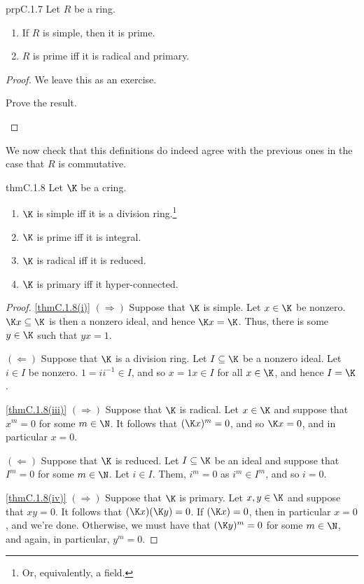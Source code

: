 \begin{prp}{}{prpC.1.7}
	Let $R$ be a ring.
	\begin{enumerate}
		\item \label{prpC.1.7(i)}If $R$ is simple, then it is prime.
		\item \label{prpC.1.7(ii)}$R$ is prime iff it is radical and primary.
	\end{enumerate}
	\begin{proof}
		We leave this as an exercise.
		\begin{exr}[breakable=false]{}{}
			Prove the result.
		\end{exr}
	\end{proof}
\end{prp}
We now check that this definitions do indeed agree with the previous ones in the case that $R$ is commutative.
\begin{thm}{}{thmC.1.8}
	Let $\K$ be a cring.
	\begin{enumerate}
		\item \label{thmC.1.8(i)}$\K$ is simple iff it is a division ring.\footnote{Or, equivalently, a field.}
		\item \label{thmC.1.8(ii)}$\K$ is prime iff it is integral.
		\item \label{thmC.1.8(iii)}$\K$ is radical iff it is reduced.
		\item \label{thmC.1.8(iv)}$\K$ is primary iff it hyper-connected.
	\end{enumerate}
	\begin{proof}
		\cref{thmC.1.8(i)} $(\Rightarrow )$ Suppose that $\K$ is simple.  Let $x\in \K$ be nonzero.  $\K x\subseteq \K$ is then a nonzero ideal, and hence $\K x=\K$.  Thus, there is some $y\in \K$ such that $yx=1$.
		
		$(\Leftarrow )$ Suppose that $\K$ is a division ring.  Let $I\subseteq \K$ be a nonzero ideal.  Let $i\in I$ be nonzero.  $1=ii^{-1}\in I$, and so $x=1x\in I$ for all $x\in \K$, and hence $I=\K$.
		
		\blni
		\cref{thmC.1.8(iii)} $(\Rightarrow )$ Suppose that $\K$ is radical.  Let $x\in \K$ and suppose that $x^m=0$ for some $m\in \N$.  It follows that $(\K x)^m=0$, and so $\K x=0$, and in particular $x=0$.
		
		$(\Leftarrow )$ Suppose that $\K$ is reduced.  Let $I\subseteq \K$ be an ideal and suppose that $I^m=0$ for some $m\in \N$.  Let $i\in I$.  Them, $i^m=0$ as $i^m\in I^m$, and so $i=0$.
		
		\blni
		\cref{thmC.1.8(iv)} $(\Rightarrow )$ Suppose that $\K$ is primary.  Let $x,y\in \K$ and suppose that $xy=0$.  It follows that $(\K x)(\K y)=0$.  If $(\K x)=0$, then in particular $x=0$, and we're done.  Otherwise, we must have that $(\K y)^m=0$ for some $m\in \N$, and again, in particular, $y^m=0$.
		

\end{proof}
\end{thm}
